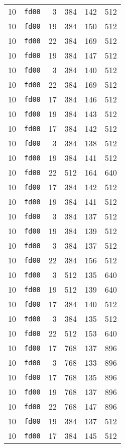 \documentclass{article}
\begin{document}
\begin{table}[h!]
\begin{tabular}{llrrrl}
    10 & \texttt{fd00} & 3 & 384 & 142 & 512 \\
    10 & \texttt{fd00} & 19 & 384 & 150 & 512 \\
    10 & \texttt{fd00} & 22 & 384 & 169 & 512 \\
    10 & \texttt{fd00} & 19 & 384 & 147 & 512 \\
    10 & \texttt{fd00} & 3 & 384 & 140 & 512 \\
    10 & \texttt{fd00} & 22 & 384 & 169 & 512 \\
    10 & \texttt{fd00} & 17 & 384 & 146 & 512 \\
    10 & \texttt{fd00} & 19 & 384 & 143 & 512 \\
    10 & \texttt{fd00} & 17 & 384 & 142 & 512 \\
    10 & \texttt{fd00} & 3 & 384 & 138 & 512 \\
    10 & \texttt{fd00} & 19 & 384 & 141 & 512 \\
    10 & \texttt{fd00} & 22 & 512 & 164 & 640 \\
    10 & \texttt{fd00} & 17 & 384 & 142 & 512 \\
    10 & \texttt{fd00} & 19 & 384 & 141 & 512 \\
    10 & \texttt{fd00} & 3 & 384 & 137 & 512 \\
    10 & \texttt{fd00} & 19 & 384 & 139 & 512 \\
    10 & \texttt{fd00} & 3 & 384 & 137 & 512 \\
    10 & \texttt{fd00} & 22 & 384 & 156 & 512 \\
    10 & \texttt{fd00} & 3 & 512 & 135 & 640 \\
    10 & \texttt{fd00} & 19 & 512 & 139 & 640 \\
    10 & \texttt{fd00} & 17 & 384 & 140 & 512 \\
    10 & \texttt{fd00} & 3 & 384 & 135 & 512 \\
    10 & \texttt{fd00} & 22 & 512 & 153 & 640 \\
    10 & \texttt{fd00} & 17 & 768 & 137 & 896 \\
    10 & \texttt{fd00} & 3 & 768 & 133 & 896 \\
    10 & \texttt{fd00} & 17 & 768 & 135 & 896 \\
    10 & \texttt{fd00} & 19 & 768 & 137 & 896 \\
    10 & \texttt{fd00} & 22 & 768 & 147 & 896 \\
    10 & \texttt{fd00} & 19 & 384 & 137 & 512 \\
    10 & \texttt{fd00} & 17 & 384 & 145 & 512 \\

\end{tabular}
\end{table}
\end{document}
